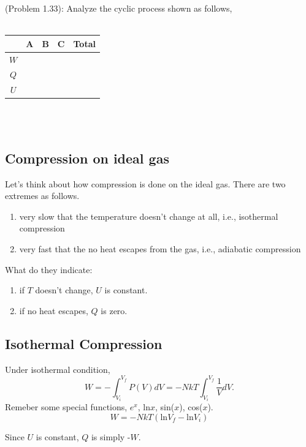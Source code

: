\documentclass[twoside]{article}
\begin{document}
(Problem 1.33):
Analyze the cyclic process shown as follows,\\\\

\begin{tabular}{|c | c | c | c | c |}
\hline
    & A & B & C & Total \\\hline
$W$ &   &   &   &\\\hline
$Q$ &   &   &   &\\\hline
$U$ &   &   &   &\\\hline
\end{tabular}\\\\


\subsection{Compression on ideal gas}
Let's think about how compression is done on the ideal gas. There are two extremes as follows.
\begin{enumerate}
\item{very slow that the temperature doesn't change at all, i.e., isothermal compression}
\item{very fast that the no heat escapes from the gas, i.e., adiabatic compression}
\end{enumerate}
What do they indicate:
\begin{enumerate}
\item{if $T$ doesn't change, $U$ is constant.}
\item{if no heat escapes, $Q$ is zero.}
\end{enumerate}

\subsection{Isothermal Compression}
Under isothermal condition,
\begin{equation} \label{isot} 
 W = -\int_{V_{i}}^{V_{f}} P(V)dV = -NkT \int_{V_{i}}^{V_{f}} \frac{1}{V}dV.
\end{equation}
Remeber some special functions, $e^x$, ln$x$, sin($x$), cos($x$).
\begin{equation} \label{isot} 
 W = -NkT(\textrm{ln}V_f - \textrm{ln}V_i)
\end{equation}

Since $U$ is constant, $Q$ is simply -$W$.
\end{document}
